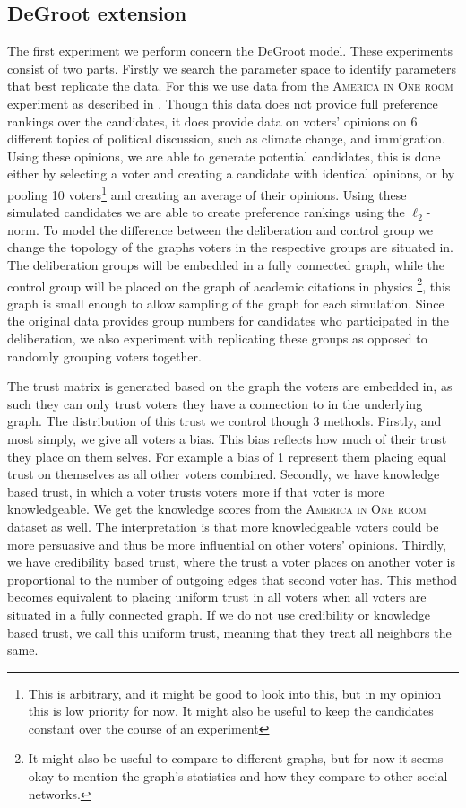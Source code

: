 \subsection{DeGroot extension}

The first experiment we perform concern the DeGroot model. These experiments
consist of two parts. Firstly we search the parameter space to identify
parameters that best replicate the data. For this we use data from the
\textsc{America in One room} experiment as described in .
Though this data does not provide full preference rankings over the
candidates, it does provide data on voters' opinions on 6 different topics
of political discussion, such as climate change, and immigration. Using
these opinions, we are able to generate potential candidates, this is done
either by selecting a voter and creating a candidate with identical
opinions, or by pooling 10 voters\footnote{This is arbitrary, and it might
	be good to look into this, but in my opinion this is low priority
	for now. It might also be useful to keep the candidates constant over the
	course of an experiment} and creating an average of their opinions. Using
these simulated candidates we are able to create preference rankings using
the $\ell_2$-norm. To model the difference between the deliberation and
control group we change the topology of the graphs voters in the respective
groups are situated in. The deliberation groups will be embedded in a fully
connected graph, while the control group will be placed on the graph of
academic citations in physics \cite{nr}\footnote{It might also be useful to
compare to different graphs, but for now it seems okay to mention the graph's
statistics and how they compare to other social networks.}, this graph is small
enough to allow sampling of the graph for each simulation. Since the original
data provides group numbers for candidates who participated in the
deliberation, we also experiment with replicating these groups as opposed to
randomly grouping voters together.

The trust matrix is generated based on the graph the voters are embedded in, as
such they can only trust voters they have a connection to in the underlying
graph. The distribution of this trust we control though 3 methods. Firstly, and
most simply, we give all voters a bias. This bias reflects how much of their
trust they place on them selves. For example a bias of 1 represent them placing
equal trust on themselves as all other voters combined. Secondly, we have
knowledge based trust, in which a voter trusts voters more if that voter is
more knowledgeable. We get the knowledge scores from the \textsc{America in One
room} dataset as well. The interpretation is that more knowledgeable voters
could be more persuasive and thus be more influential on other voters'
opinions. Thirdly, we have credibility based trust, where the trust a voter
places on another voter is proportional to the number of outgoing edges that
second voter has. This method becomes equivalent to placing uniform trust in
all voters when all voters are situated in a fully connected graph. If we do
not use credibility or knowledge based trust, we call this uniform trust,
meaning that they treat all neighbors the same.

